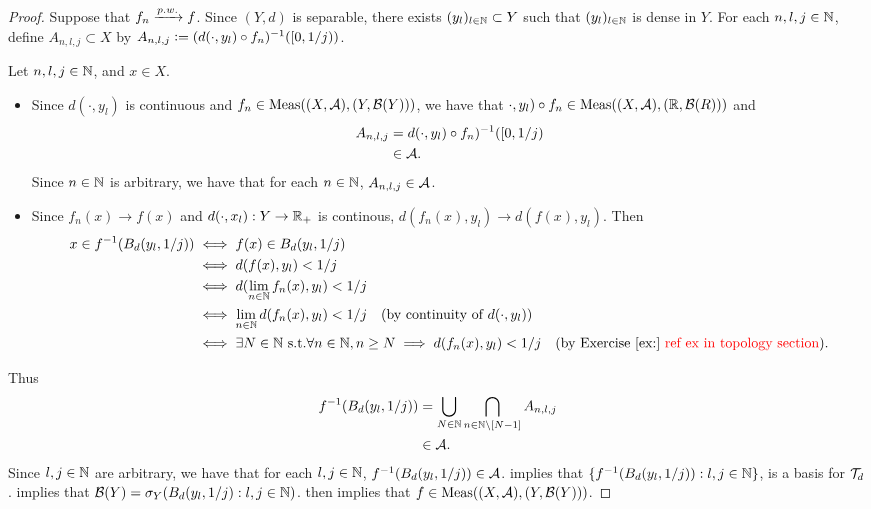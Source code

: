 \documentclass{book}
\begin{document}
	\begin{proof}
		Suppose that $f_n \xrightarrow{p.w.} f$. Since $(Y,d)$ is separable, there exists $(y_l)_{l \in \mathbb{N}} \subset Y$ such that $(y_l)_{l \in \mathbb{N}}$ is dense in $Y$. For each $n,l, j \in \mathbb{N}$, define $A_{n,l,j} \subset X$ by $A_{n,l,j} \vcentcolon= (d(\cdot , y_l) \circ f_n)^{-1}([0, 1/j))$.
		
		Let $n, l,j \in \mathbb{N}$, and $x \in X$. 
		\begin{itemize}
			\item Since $d(\cdot , y_l)$ is continuous and $f_n \in \operatorname{\text{Meas}}((X, \mathcal{A}), (Y, \mathcal{B}(Y)))$, we have that $\cdot , y_l) \circ f_n \in \operatorname{\text{Meas}}((X, \mathcal{A}), (\mathbb{R}, \mathcal{B}(R)))$ and 
			\begin{align*}
				A_{n,l,j}
				& = d(\cdot , y_l) \circ f_n)^{-1}([0, 1/j) \\
				& \in \mathcal{A}.
			\end{align*}
			Since $n \in \mathbb{N}$ is arbitrary, we have that for each $n \in \mathbb{N}$, $A_{n, l,j} \in \mathcal{A}$. 
			\item Since $f_n(x) \rightarrow f(x)$ and $d(\cdot, x_l):Y \rightarrow \mathbb{R}_+$ is continous, $d(f_n(x), y_l) \rightarrow d(f(x), y_l)$. Then 
			\begin{align*}
				x \in f^{-1}(B_d(y_l, 1/j))
				& \iff f(x) \in B_d(y_l, 1/j) \\
				& \iff d(f(x), y_l) < 1/j \\
				& \iff d(\lim\limits_{n \in \N} f_n(x), y_l) < 1/j \\
				& \iff \lim\limits_{n \in \N} d(f_n(x), y_l) < 1/j \quad \text{(by continuity of $d(\cdot, y_l)$)} \\
				& \iff \exists N \in \N \text{ s.t.} \forall n \in \N, n \geq N \implies d(f_n(x), y_l) < 1/j \quad \text{(by \rex{} \tcr{ref ex in topology section})}.   
			\end{align*}
		\end{itemize}
		Thus 
		\begin{align*}
			f^{-1}(B_d(y_l, 1/j))
			& = \bigcup\limits_{N \in \mathbb{N}} \bigcap\limits_{n \in \mathbb{N} \setminus [N-1]} A_{n,l,j} \\
			& \in \mathcal{A}. 
		\end{align*}
		Since $l,j \in \mathbb{N}$ are arbitrary, we have that for each $l,j \in \mathbb{N}$, $f^{-1}(B_d(y_l, 1/j)) \in \mathcal{A}$.  implies that $\{f^{-1}(B_d(y_l, 1/j)): l,j \in \mathbb{N}\}$, is a basis for $\mathcal{T}_d$.  implies that $\mathcal{B}(Y) = \sigma_Y(B_d(y_l, 1/j): l,j \in \mathbb{N})$.  then implies that $f \in  \operatorname{\text{Meas}}((X, \mathcal{A}), (Y, \mathcal{B}(Y)))$. 
	\end{proof}
	
\end{document}
